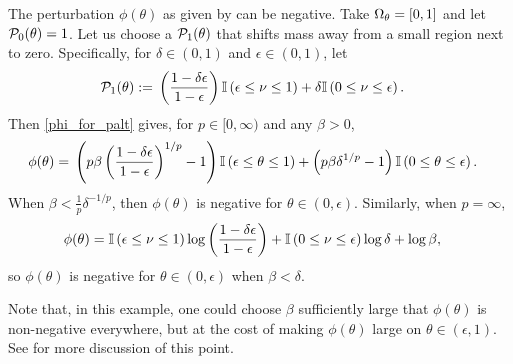 \begin{ex}
%
The perturbation $\phi(\theta)$ as given by  can be
negative. Take $\Omega_{\theta} = [0,1]$ and let $\mathcal{P}_{0}(\theta) = 1$. Let us choose a
$\mathcal{P}_{1}(\theta)$ that shifts mass away from a small region next to zero.
Specifically, for  $\delta \in (0, 1)$ and $\epsilon \in (0, 1)$, let
%
\begin{align*}
%
\palt(\theta) :={}&
    \left(\frac{1-\delta \epsilon}{1 - \epsilon} \right)
        \ind{\epsilon \le \nu \le 1} +
    \delta \ind{0 \le \nu \le \epsilon}.
%
\end{align*}
%
Then \eqref{phi_for_palt} gives, for $p \in [0, \infty)$ and any $\beta > 0$,
%
\begin{align*}
%
\phi(\theta) ={}&
    \left( p \beta\left(\frac{1-\delta \epsilon}{1-\epsilon} \right)^{1/p}
        - 1
    \right)
        \ind{\epsilon \le \theta \le 1} +
    \left(p \beta \delta^{1/p} - 1 \right) \ind{0 \le \theta \le \epsilon}.
%
\end{align*}
%
When $\beta < \frac{1}{p} \delta^{-1/p}$, then $\phi(\theta)$ is negative for
$\theta \in (0, \epsilon)$.  Similarly, when $p = \infty$,
%
\begin{align*}
%
\phi(\theta) ={}&
    \ind{\epsilon \le \nu \le 1}
        \log \left(\frac{1-\delta \epsilon}{1 - \epsilon} \right) +
    \ind{0 \le \nu \le \epsilon} \log \delta + \log \beta,
%
\end{align*}
%
so $\phi(\theta)$ is negative for $\theta \in (0, \epsilon)$ when
$\beta < \delta$.

Note that, in this example, one could choose $\beta$ sufficiently large that
$\phi(\theta)$ is non-negative everywhere, but at the cost of making
$\phi(\theta)$ large on $\theta \in (\epsilon, 1)$.   See 
for more discussion of this point.

\end{ex}



